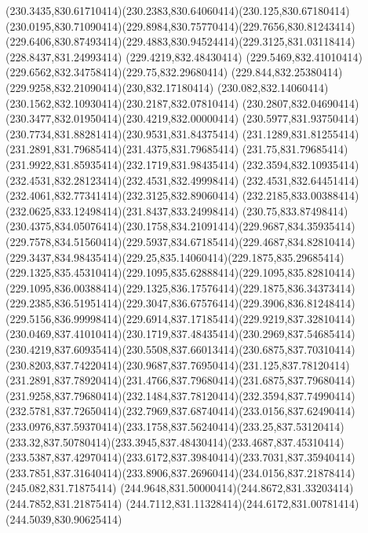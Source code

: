 {{	\curveto(230.3435,830.61710414)(230.2383,830.64060414)(230.125,830.67180414)
	\curveto(230.0195,830.71090414)(229.8984,830.75770414)(229.7656,830.81243414)
	\curveto(229.6406,830.87493414)(229.4883,830.94524414)(229.3125,831.03118414)
	\lineto(228.8437,831.24993414)
	\lineto(229.4219,832.48430414)
	\curveto(229.5469,832.41010414)(229.6562,832.34758414)(229.75,832.29680414)
	\curveto(229.844,832.25380414)(229.9258,832.21090414)(230,832.17180414)
	\curveto(230.082,832.14060414)(230.1562,832.10930414)(230.2187,832.07810414)
	\curveto(230.2807,832.04690414)(230.3477,832.01950414)(230.4219,832.00000414)
	\curveto(230.5977,831.93750414)(230.7734,831.88281414)(230.9531,831.84375414)
	\curveto(231.1289,831.81255414)(231.2891,831.79685414)(231.4375,831.79685414)
	\curveto(231.75,831.79685414)(231.9922,831.85935414)(232.1719,831.98435414)
	\curveto(232.3594,832.10935414)(232.4531,832.28123414)(232.4531,832.49998414)
	\curveto(232.4531,832.64451414)(232.4061,832.77341414)(232.3125,832.89060414)
	\curveto(232.2185,833.00388414)(232.0625,833.12498414)(231.8437,833.24998414)
	\lineto(230.75,833.87498414)
	\curveto(230.4375,834.05076414)(230.1758,834.21091414)(229.9687,834.35935414)
	\curveto(229.7578,834.51560414)(229.5937,834.67185414)(229.4687,834.82810414)
	\curveto(229.3437,834.98435414)(229.25,835.14060414)(229.1875,835.29685414)
	\curveto(229.1325,835.45310414)(229.1095,835.62888414)(229.1095,835.82810414)
	\curveto(229.1095,836.00388414)(229.1325,836.17576414)(229.1875,836.34373414)
	\curveto(229.2385,836.51951414)(229.3047,836.67576414)(229.3906,836.81248414)
	\curveto(229.5156,836.99998414)(229.6914,837.17185414)(229.9219,837.32810414)
	\curveto(230.0469,837.41010414)(230.1719,837.48435414)(230.2969,837.54685414)
	\curveto(230.4219,837.60935414)(230.5508,837.66013414)(230.6875,837.70310414)
	\curveto(230.8203,837.74220414)(230.9687,837.76950414)(231.125,837.78120414)
	\curveto(231.2891,837.78920414)(231.4766,837.79680414)(231.6875,837.79680414)
	\curveto(231.9258,837.79680414)(232.1484,837.78120414)(232.3594,837.74990414)
	\curveto(232.5781,837.72650414)(232.7969,837.68740414)(233.0156,837.62490414)
	\curveto(233.0976,837.59370414)(233.1758,837.56240414)(233.25,837.53120414)
	\curveto(233.32,837.50780414)(233.3945,837.48430414)(233.4687,837.45310414)
	\curveto(233.5387,837.42970414)(233.6172,837.39840414)(233.7031,837.35940414)
	\curveto(233.7851,837.31640414)(233.8906,837.26960414)(234.0156,837.21878414)
	\closepath
	\moveto(245.082,831.71875414)
	\curveto(244.9648,831.50000414)(244.8672,831.33203414)(244.7852,831.21875414)
	\curveto(244.7112,831.11328414)(244.6172,831.00781414)(244.5039,830.90625414)
}}
